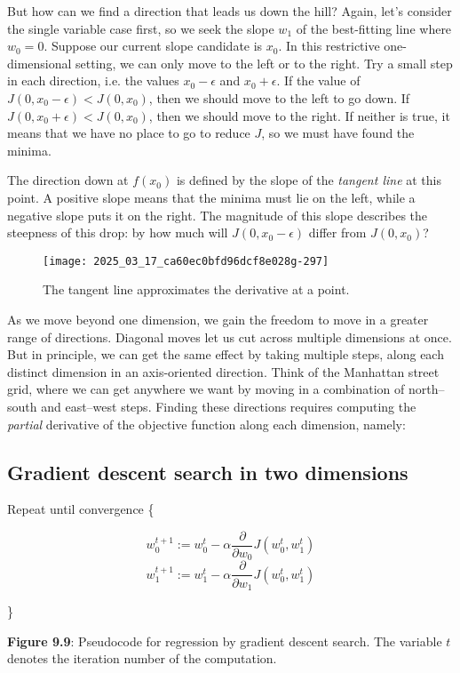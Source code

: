 \documentclass[10pt]{article}
\begin{document}
But how can we find a direction that leads us down the hill? Again, let’s consider the single variable case first, so we seek the slope $w_{1}$ of the best-fitting line where $w_{0}=0$. Suppose our current slope candidate is $x_{0}$. In this restrictive one-dimensional setting, we can only move to the left or to the right. Try a small step in each direction, i.e. the values $x_{0}-\epsilon$ and $x_{0}+\epsilon$. If the value of $J(0, x_{0}-\epsilon)<J(0, x_{0})$, then we should move to the left to go down. If $J(0, x_{0}+\epsilon)<J(0, x_{0})$, then we should move to the right. If neither is true, it means that we have no place to go to reduce $J$, so we must have found the minima.

The direction down at $f(x_{0})$ is defined by the slope of the \textit{tangent line} at this point. A positive slope means that the minima must lie on the left, while a negative slope puts it on the right. The magnitude of this slope describes the steepness of this drop: by how much will $J(0, x_{0}-\epsilon)$ differ from $J(0, x_{0})$?

\begin{figure}[h]
    \centering
    \texttt{[image: 2025\_03\_17\_ca60ec0bfd96dcf8e028g-297]}
    \caption{The tangent line approximates the derivative at a point.}
\end{figure}

As we move beyond one dimension, we gain the freedom to move in a greater range of directions. Diagonal moves let us cut across multiple dimensions at once. But in principle, we can get the same effect by taking multiple steps, along each distinct dimension in an axis-oriented direction. Think of the Manhattan street grid, where we can get anywhere we want by moving in a combination of north–south and east–west steps. Finding these directions requires computing the \textit{partial} derivative of the objective function along each dimension, namely:

\subsection*{Gradient descent search in two dimensions}
Repeat until convergence \{

\[ w_{0}^{t+1}:=w_{0}^{t}-\alpha \frac{\partial}{\partial w_{0}} J(w_{0}^{t}, w_{1}^{t}) \]
\[ w_{1}^{t+1}:=w_{1}^{t}-\alpha \frac{\partial}{\partial w_{1}} J(w_{0}^{t}, w_{1}^{t}) \]

\}

\textbf{Figure 9.9}: Pseudocode for regression by gradient descent search. The variable $t$ denotes the iteration number of the computation.
\end{document}
